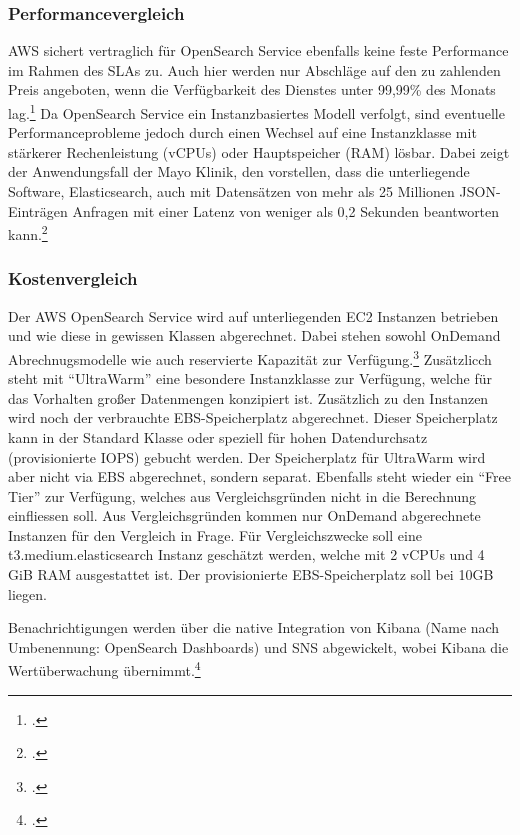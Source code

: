 \subsubsection{Performancevergleich}
\ac{AWS} sichert vertraglich für OpenSearch Service ebenfalls keine feste Performance im Rahmen des \acp{SLA} zu. Auch hier werden nur Abschläge auf den zu zahlenden Preis angeboten, wenn die Verfügbarkeit des Dienstes unter 99,99\% des Monats lag.\footcite[Vgl.][]{AmazonWebServicesInc..2019} Da OpenSearch Service ein Instanzbasiertes Modell verfolgt, sind eventuelle Performanceprobleme jedoch durch einen Wechsel auf eine Instanzklasse mit stärkerer Rechenleistung (vCPUs) oder Hauptspeicher (\ac{RAM}) lösbar. Dabei zeigt der Anwendungsfall der Mayo Klinik, den \citeauthor{Chen.2017} vorstellen, dass die unterliegende Software, Elasticsearch, auch mit Datensätzen von mehr als 25 Millionen \ac{JSON}-Einträgen Anfragen mit einer Latenz von weniger als 0,2 Sekunden beantworten kann.\footcite[Vgl.][]{Chen.2017}

\subsubsection{Kostenvergleich}
Der \ac{AWS} OpenSearch Service wird auf unterliegenden \ac{EC2} Instanzen betrieben und wie diese in gewissen Klassen abgerechnet. Dabei stehen sowohl OnDemand Abrechnugsmodelle wie auch reservierte Kapazität zur Verfügung.\footcite[Vgl. auch im Folgenden][]{AmazonWebServicesInc..o.J.w} Zusätzlicch steht mit \enquote{UltraWarm} eine besondere Instanzklasse zur Verfügung, welche für das Vorhalten großer Datenmengen konzipiert ist. Zusätzlich zu den Instanzen wird noch der verbrauchte \ac{EBS}-Speicherplatz abgerechnet. Dieser Speicherplatz kann in der Standard Klasse oder speziell für hohen Datendurchsatz (provisionierte \ac{IOPS}) gebucht werden. Der Speicherplatz für UltraWarm wird aber nicht via \ac{EBS} abgerechnet, sondern separat. Ebenfalls steht wieder ein \enquote{Free Tier} zur Verfügung, welches aus Vergleichsgründen nicht in die Berechnung einfliessen soll. Aus Vergleichsgründen kommen nur OnDemand abgerechnete Instanzen für den Vergleich in Frage. Für Vergleichszwecke soll eine t3.medium.elasticsearch Instanz geschätzt werden, welche mit 2 vCPUs und 4 GiB \ac{RAM} ausgestattet ist. Der provisionierte \ac{EBS}-Speicherplatz soll bei 10GB liegen.

Benachrichtigungen werden über die native Integration von Kibana (Name nach Umbenennung: OpenSearch Dashboards) und \ac{SNS} abgewickelt, wobei Kibana die Wertüberwachung übernimmt.\footcite[Vgl.][]{AmazonWebServicesInc..o.J.x}

